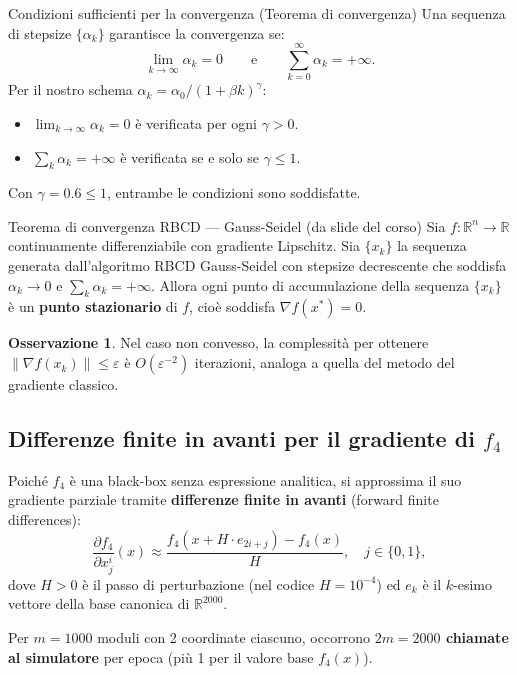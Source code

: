 \documentclass[12pt,a4paper]{article}
\theoremstyle{definition}
\newtheorem{remark}[theorem]{Osservazione}
\newcommand{\R}{\mathbb{R}}
\newcommand{\grad}{\nabla}
\begin{document}
\begin{thmbox}{Condizioni sufficienti per la convergenza (Teorema di convergenza)}
Una sequenza di stepsize $\{\alpha_k\}$ garantisce la convergenza se:
\[
  \lim_{k \to \infty} \alpha_k = 0 \qquad \text{e} \qquad \sum_{k=0}^{\infty} \alpha_k = +\infty.
\]
Per il nostro schema $\alpha_k = \alpha_0 / (1 + \beta k)^\gamma$:
\begin{itemize}
  \item $\lim_{k\to\infty} \alpha_k = 0$ è verificata per ogni $\gamma > 0$.
  \item $\sum_k \alpha_k = +\infty$ è verificata se e solo se $\gamma \leq 1$.
\end{itemize}
Con $\gamma = 0.6 \leq 1$, entrambe le condizioni sono soddisfatte.
\end{thmbox}

\begin{thmbox}{Teorema di convergenza RBCD — Gauss-Seidel (da slide del corso)}
Sia $f : \R^n \to \R$ continuamente differenziabile con gradiente Lipschitz.
Sia $\{x_k\}$ la sequenza generata dall'algoritmo RBCD Gauss-Seidel con stepsize decrescente
che soddisfa $\alpha_k \to 0$ e $\sum_k \alpha_k = +\infty$.
Allora ogni punto di accumulazione della sequenza $\{x_k\}$ è un \textbf{punto stazionario}
di $f$, cioè soddisfa $\grad f(x^*) = 0$.
\end{thmbox}

\begin{remark}
Nel caso non convesso, la complessità per ottenere $\|\grad f(x_k)\| \leq \varepsilon$ è
$O(\varepsilon^{-2})$ iterazioni, analoga a quella del metodo del gradiente classico.
\end{remark}

\subsection{Differenze finite in avanti per il gradiente di $f_4$}

Poiché $f_4$ è una black-box senza espressione analitica, si approssima il suo gradiente
parziale tramite \textbf{differenze finite in avanti} (forward finite differences):
\[
  \frac{\partial f_4}{\partial x^i_j}(x) \approx
  \frac{f_4(x + H \cdot e_{2i+j}) - f_4(x)}{H},
  \quad j \in \{0,1\},
\]
dove $H > 0$ è il passo di perturbazione (nel codice $H = 10^{-4}$) ed $e_k$ è il $k$-esimo
vettore della base canonica di $\R^{2000}$.

Per $m = 1000$ moduli con 2 coordinate ciascuno, occorrono \textbf{$2m = 2000$ chiamate al
simulatore} per epoca (più 1 per il valore base $f_4(x)$).
\end{document}
